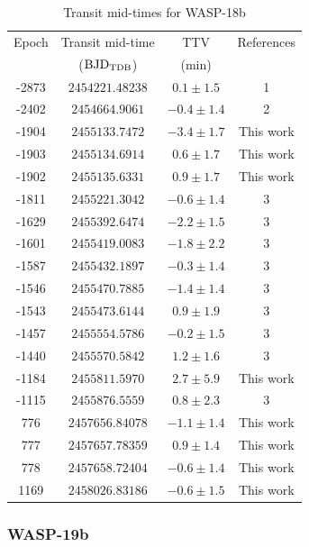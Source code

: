 \begin{table}[H]
\centering
\caption{Transit mid-times for WASP-18b}
\label{times_wasp18}
\begin{tabular}{cccc}
\hline \hline
Epoch & Transit mid-time & TTV & References\\
      & (${\rm BJD_{TDB}}$) & (min) & \\
\hline 
-2873 & $2454221.48238$ & $0.1\pm1.5$ & 1\\
-2402 & $2454664.9061$ & $-0.4\pm1.4$ & 2 \\
-1904 & $2455133.7472$ & $-3.4\pm1.7$ & This work \\
-1903 & $2455134.6914$ & $0.6\pm1.7$ & This work \\
-1902 & $2455135.6331$  & $0.9\pm1.7$  & This work \\
-1811 & $2455221.3042$ & $-0.6\pm1.4$  & 3\\
-1629 & $2455392.6474$ & $-2.2\pm1.5$& 3 \\
-1601 & $2455419.0083$ & $-1.8\pm2.2$& 3\\
-1587 & $2455432.1897$ & $-0.3\pm1.4$ & 3\\
-1546 & $2455470.7885$ & $-1.4\pm1.4$ & 3\\
-1543 & $2455473.6144$ & $0.9\pm1.9$& 3\\
-1457 & $2455554.5786$ & $-0.2\pm1.5$&3 \\
-1440 & $2455570.5842$ & $1.2\pm1.6$& 3\\
-1184 & $2455811.5970$ &  $2.7\pm5.9$ & This work  \\
-1115 & $2455876.5559$ & $0.8\pm2.3$ & 3 \\ 
776 & $2457656.84078$ & $-1.1\pm1.4$ & This work  \\
777 & $2457657.78359$   & $0.9\pm1.4$ & This work\\
778 & $2457658.72404$ & $-0.6\pm1.4$ & This work \\
1169 & $2458026.83186$ & $-0.6\pm1.5$ & This work  \\
\hline
\end{tabular}
\end{table} 

\subsubsection{WASP-19b}

